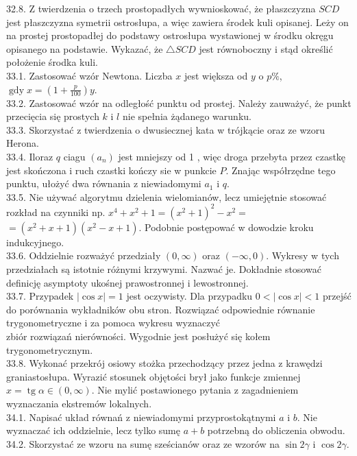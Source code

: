 \documentclass[10pt]{article}
\begin{document}
32.8. Z twierdzenia o trzech prostopadłych wywnioskować, że płaszczyzna $S C D$ jest płaszczyzna symetrii ostrosłupa, a więc zawiera środek kuli opisanej. Leży on na prostej prostopadłej do podstawy ostrosłupa wystawionej w środku okręgu opisanego na podstawie. Wykazać, że $\triangle S C D$ jest równoboczny i stąd określić położenie środka kuli.\\
33.1. Zastosować wzór Newtona. Liczba $x$ jest większa od $y$ o $p \%$, $\operatorname{gdy} x=\left(1+\frac{p}{100}\right) y$.\\
33.2. Zastosować wzór na odległość punktu od prostej. Należy zauważyć, że punkt przecięcia się prostych $k$ i $l$ nie spełnia żądanego warunku.\\
33.3. Skorzystać z twierdzenia o dwusiecznej kata w trójkącie oraz ze wzoru Herona.\\
33.4. Iloraz $q$ ciagu $\left(a_{n}\right)$ jest mniejszy od 1 , więc droga przebyta przez czastkę jest skończona i ruch czastki kończy sie w punkcie $P$. Znając współrzędne tego punktu, ułożyć dwa równania z niewiadomymi $a_{1}$ i $q$.\\
33.5. Nie używać algorytmu dzielenia wielomianów, lecz umiejętnie stosować rozkład na czynniki np. $x^{4}+x^{2}+1=\left(x^{2}+1\right)^{2}-x^{2}=$ $=\left(x^{2}+x+1\right)\left(x^{2}-x+1\right)$. Podobnie postępować w dowodzie kroku indukcyjnego.\\
33.6. Oddzielnie rozważyć przedziały $(0, \infty)$ oraz $(-\infty, 0)$. Wykresy w tych przedziałach są istotnie różnymi krzywymi. Nazwać je. Dokładnie stosować definicję asymptoty ukośnej prawostronnej i lewostronnej.\\
33.7. Przypadek $|\cos x|=1$ jest oczywisty. Dla przypadku $0<|\cos x|<1$ przejść do porównania wykładników obu stron. Rozwiązać odpowiednie równanie trygonometryczne i za pomoca wykresu wyznaczyć\\
zbiór rozwiązań nierówności. Wygodnie jest posłużyć się kołem trygonometrycznym.\\
33.8. Wykonać przekrój osiowy stożka przechodzący przez jedna z krawędzi graniastosłupa. Wyrazić stosunek objętości brył jako funkcje zmiennej $x=\operatorname{tg} \alpha \in(0, \infty)$. Nie mylić postawionego pytania z zagadnieniem wyznaczania ekstremów lokalnych.\\
34.1. Napisać układ równań z niewiadomymi przyprostokątnymi $a$ i $b$. Nie wyznaczać ich oddzielnie, lecz tylko sumę $a+b$ potrzebną do obliczenia obwodu.\\
34.2. Skorzystać ze wzoru na sumę sześcianów oraz ze wzorów na $\sin 2 \gamma$ i $\cos 2 \gamma$.\\
\end{document}

